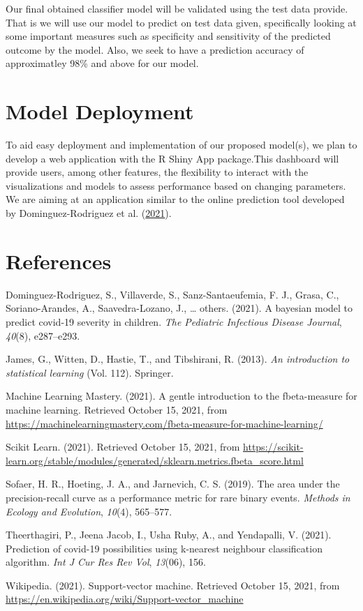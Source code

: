 \documentclass[
  10pt,
]{article}
\begin{document}
Our final obtained classifier model will be validated using the test data provide. That is we will use our model to predict on test data given, specifically looking at some important measures such as specificity and sensitivity of the predicted outcome by the model. Also, we seek to have a prediction accuracy of approximatley 98\% and above for our model.

\section{Model Deployment}

To aid easy deployment and implementation of our proposed model(s), we plan to develop a web application with the R Shiny App package.This dashboard will provide users, among other features, the flexibility to interact with the visualizations and models to assess performance based on changing parameters. We are aiming at an application similar to the online prediction tool developed by Dominguez-Rodriguez et al. (\protect\hyperlink{ref-dominguez2021bayesian}{2021}).

\hypertarget{references}{%
\section*{References}\label{references}}

\hypertarget{refs}{}
\leavevmode\hypertarget{ref-dominguez2021bayesian}{}%
Dominguez-Rodriguez, S., Villaverde, S., Sanz-Santaeufemia, F. J., Grasa, C., Soriano-Arandes, A., Saavedra-Lozano, J., \ldots{} others. (2021). A bayesian model to predict covid-19 severity in children. \emph{The Pediatric Infectious Disease Journal}, \emph{40}(8), e287--e293.

\leavevmode\hypertarget{ref-james2013introduction}{}%
James, G., Witten, D., Hastie, T., and Tibshirani, R. (2013). \emph{An introduction to statistical learning} (Vol. 112). Springer.

\leavevmode\hypertarget{ref-MLM}{}%
Machine Learning Mastery. (2021). A gentle introduction to the fbeta-measure for machine learning. Retrieved October 15, 2021, from \url{https://machinelearningmastery.com/fbeta-measure-for-machine-learning/}

\leavevmode\hypertarget{ref-scikit_learn}{}%
Scikit Learn. (2021). Retrieved October 15, 2021, from \url{https://scikit-learn.org/stable/modules/generated/sklearn.metrics.fbeta_score.html}

\leavevmode\hypertarget{ref-sofaer2019area}{}%
Sofaer, H. R., Hoeting, J. A., and Jarnevich, C. S. (2019). The area under the precision-recall curve as a performance metric for rare binary events. \emph{Methods in Ecology and Evolution}, \emph{10}(4), 565--577.

\leavevmode\hypertarget{ref-theerthagiri2021prediction}{}%
Theerthagiri, P., Jeena Jacob, I., Usha Ruby, A., and Yendapalli, V. (2021). Prediction of covid-19 possibilities using k-nearest neighbour classification algorithm. \emph{Int J Cur Res Rev\textbar{} Vol}, \emph{13}(06), 156.

\leavevmode\hypertarget{ref-wikipedia}{}%
Wikipedia. (2021). Support-vector machine. Retrieved October 15, 2021, from \url{https://en.wikipedia.org/wiki/Support-vector_machine}
\end{document}

